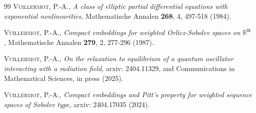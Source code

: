 \documentclass{article}
\begin{document}
\begin{thebibliography}{99}
 \textsc{Vuillermot, P.-A.,} \textit{A class of
elliptic partial differential equations with exponential nonlinearities,}
Mathematische Annalen \textbf{268}, 4, 497-518 (1984).

 \textsc{Vuillermot, P.-A., }\textit{Compact
embeddings for weighted Orlicz-Sobolev spaces on} $\mathbb{R}^{\mathsf{N}}$,
Mathematische Annalen \textbf{279}, 2, 277-296 (1987).

 \textsc{Vuillermot, P.-A.,} \textit{On the
relaxation to equilibrium of a quantum oscillator interacting with a
radiation field, }arxiv: 2404.11329, and Communications in Mathematical
Sciences, in press (2025).

 \textsc{Vuillermot, P.-A.,} \textit{Compact embeddings
and Pitt's property for weighted sequence spaces of Sobolev type, }arxiv:
2404.17035 (2024).
\end{thebibliography}
\end{document}
